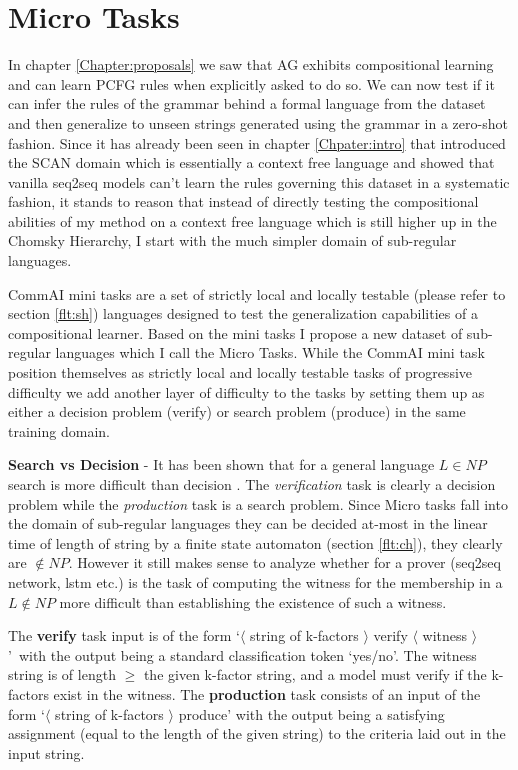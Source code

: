 \chapter{Micro Tasks}\label{Chapter:datasets}
In chapter \ref{Chapter:proposals} we saw that AG exhibits compositional learning and can learn PCFG rules when explicitly asked to do so. We can now test if it can infer the rules of the grammar behind a formal language from the dataset and then generalize to unseen strings generated using the grammar in a zero-shot fashion. Since it has already been seen in chapter \ref{Chpater:intro} that \cite{Lake2017} introduced the SCAN domain which is essentially a context free language and showed that vanilla seq2seq models can't learn the rules governing this dataset in a systematic fashion, it stands to reason that instead of directly testing the compositional abilities of my method on a context free language which is still higher up in the Chomsky Hierarchy, I start with the much simpler domain of sub-regular languages.

CommAI mini tasks \citep{Baroni2017} are a set of strictly local and locally testable (please refer to section \ref{flt:sh}) languages designed to test the generalization capabilities of a compositional learner. Based on the mini tasks I propose a new dataset of sub-regular languages which I call the Micro Tasks. While the CommAI mini task position themselves as strictly local and locally testable tasks of progressive difficulty we add another layer of difficulty to the tasks by setting them up as either a decision problem (verify) or search problem (produce) in the same training domain.

\textbf{Search vs Decision} - It has been shown that for a general language $L \in NP$ search is more difficult than decision \cite{Bellare1994}. The \textit{verification} task is clearly a decision problem while the \textit{production} task is a search problem. Since Micro tasks fall into the domain of sub-regular languages they can be decided at-most in the linear time of length of string by a finite state automaton (section \ref{flt:ch}), they clearly are $\notin NP$. However it still makes sense to analyze whether for a prover (seq2seq network, lstm etc.) is the task of computing the witness for the membership in a $L \notin NP$ more difficult than establishing the existence of such a witness.

The \textbf{verify} task input is of the form \lq $\langle$ string of k-factors $\rangle$ verify $\langle$ witness $\rangle${}\rq\ with the output being a standard classification token \lq yes/no\rq{}. The witness string is of length $\geq$ the given k-factor string, and a model must verify if the k-factors exist in the witness. The \textbf{production} task consists of an input of the form \lq $\langle$ string of k-factors $\rangle$ produce\rq{} with the output being a satisfying assignment (equal to the length of the given string) to the criteria laid out in the input string.

